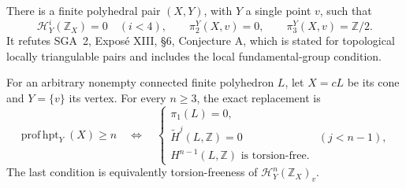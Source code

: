 \begin{proposition}\label{B:local-Hurewicz}
There is a finite polyhedral pair $(X,Y)$, with $Y$ a single point $v$, such that
\[
 \mathcal H^i_Y(\mathbb Z_X)=0\quad(i<4),\qquad
 \pi_2^Y(X,v)=0,\qquad
 \pi_3^Y(X,v)=\mathbb Z/2.
\]
It refutes SGA~2, Expos\'e XIII, \S6, Conjecture A, which is stated for topological locally triangulable pairs and includes the local fundamental-group condition.

For an arbitrary nonempty connected finite polyhedron $L$, let $X=cL$ be its cone and $Y=\{v\}$ its vertex. For every $n\geq3$, the exact replacement is
\[
 \operatorname{prof\,hpt}_{Y}(X)\geq n
 \quad\Longleftrightarrow\quad
 \begin{cases}
  \pi_1(L)=0,\\
  \widetilde H^j(L,\mathbb Z)=0& (j<n-1),\\
  H^{n-1}(L,\mathbb Z)\text{ is torsion-free}.
 \end{cases}
\]
The last condition is equivalently torsion-freeness of
$\mathcal H^n_Y(\mathbb Z_X)_v$.
\end{proposition}
